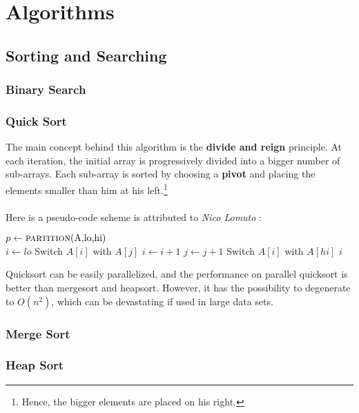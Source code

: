 \documentclass[10pt,landscape,twocolumn]{article}
\begin{document}
\section{Algorithms}

\subsection{Sorting and Searching}

\subsubsection{Binary Search}
\subsubsection{Quick Sort}

The main concept behind this algorithm is the \textbf{divide and reign} principle.  At each iteration, the initial array is progressively divided into a bigger number of sub-arrays. Each sub-array is sorted by choosing a \textbf{pivot} and placing the elements smaller than him at his left.\footnote{Hence, the bigger elements are placed on his right.} \\ \\
Here is a pseudo-code scheme is attributed to \textit{Nico Lomuto} :
\begin{algorithmic}[1]
\State $p \gets \Call {partition}{$A,lo,hi$} $ 
\State {} 
\State {} 
\EndFunction
\\
	\State $i \gets lo$ 
			\State Switch $A[i]$ with $A[j]$
			\State $i \gets i+1$
		\EndIf
		\State $j \gets j+1$
	\EndFor
	\State Switch $A[i]$ with $A[hi]$
	\Return $i$
\EndFunction
\end{algorithmic}

Quicksort can be easily parallelized, and the performance on parallel quicksort is better than mergesort and heapsort. However, it has the possibility to degenerate to $O(n^2)$, which can be devastating if used in large data sets.

\subsubsection{Merge Sort}
\subsubsection{Heap Sort}
\end{document}
